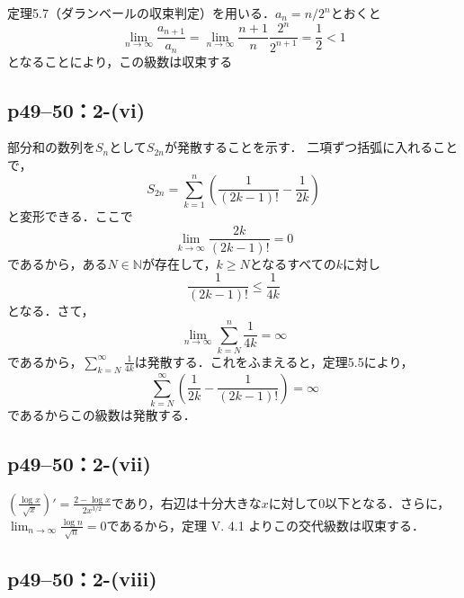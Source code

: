 \documentclass[a4paper,10pt,fleqn]{ltjsarticle}
\begin{document}
\begin{screen}
    定理5.7（ダランベールの収束判定）を用いる．$a_n=n/2^n$とおくと
    \[
        \lim_{n \to \infty}\frac{a_{n+1}}{a_n}=\lim_{n \to \infty}\frac{n+1}{n}\frac{2^n}{2^{n+1}}=\frac{1}{2}<1
    \]
    となることにより，この級数は収束する
\end{screen}

\subsection*{p49--50：2-(vi)}

\begin{screen}
    部分和の数列を$S_{n}$として$S_{2n}$が発散することを示す． 二項ずつ括弧に入れることで，
    \[
        S_{2n} = \sum ^{n}_{k=1} \left (\frac{1}{(2k-1)!} - \frac{1}{2k} \right )
    \]
    と変形できる．ここで
    \[
        \lim_{k \to \infty} \frac{2k}{(2k-1)!} = 0
    \]
    であるから，ある$N \in \mathbb{N}$が存在して，$k \geq N$となるすべての$k$に対し
    \[
        \frac{1}{(2k-1)!} \leq \frac{1}{4k}
    \]
    となる．さて，
    \[
        \lim_{n \to \infty} \sum ^{n}_{k=N} \frac{1}{4k} = \infty
    \]
    であるから，$\sum ^{\infty}_{k=N} \frac{1}{4k}$は発散する．これをふまえると，定理5.5により，
    \[
        \sum^{\infty}_{k=N} \left (\frac{1}{2k} - \frac{1}{(2k-1)!}\right) =\infty
    \]
    であるからこの級数は発散する．
\end{screen}



\subsection*{p49--50：2-(vii)}
\begin{screen}
    $\left (\frac{\log x}{\sqrt x}\right)' = \frac{2-\log x}{2x^{3/2}}$であり，右辺は十分大きな$x$に対して$0$以下となる．さらに，$\lim _{n \to \infty} \frac{\log n}{\sqrt n} = 0$であるから，定理 V. 4.1 よりこの交代級数は収束する．
\end{screen}

\subsection*{p49--50：2-(viii)}
\end{document}
